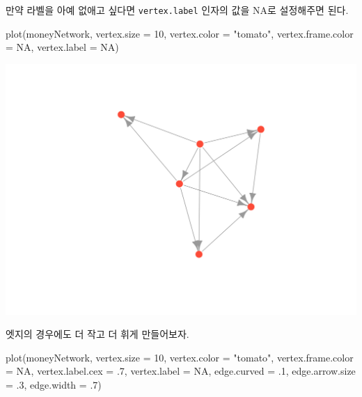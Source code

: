 \documentclass[
]{book}
\newenvironment{Shaded}{\begin{snugshade}}{\end{snugshade}}
\newcommand{\AttributeTok}[1]{\textcolor[rgb]{0.77,0.63,0.00}{#1}}
\newcommand{\ConstantTok}[1]{\textcolor[rgb]{0.00,0.00,0.00}{#1}}
\newcommand{\DecValTok}[1]{\textcolor[rgb]{0.00,0.00,0.81}{#1}}
\newcommand{\FunctionTok}[1]{\textcolor[rgb]{0.00,0.00,0.00}{#1}}
\newcommand{\NormalTok}[1]{#1}
\newcommand{\StringTok}[1]{\textcolor[rgb]{0.31,0.60,0.02}{#1}}
\begin{document}
만약 라벨을 아예 없애고 싶다면 \texttt{vertex.label} 인자의 값을 NA로 설정해주면 된다.

\begin{Shaded}
\begin{Highlighting}[]
\FunctionTok{plot}\NormalTok{(moneyNetwork, }\AttributeTok{vertex.size =} \DecValTok{10}\NormalTok{, }\AttributeTok{vertex.color =} \StringTok{"tomato"}\NormalTok{, }\AttributeTok{vertex.frame.color =} \ConstantTok{NA}\NormalTok{, }\AttributeTok{vertex.label =} \ConstantTok{NA}\NormalTok{)}
\end{Highlighting}
\end{Shaded}

\begin{center}\includegraphics[width=0.8\linewidth]{images/6} \end{center}

엣지의 경우에도 더 작고 더 휘게 만들어보자.

\begin{Shaded}
\begin{Highlighting}[]
\FunctionTok{plot}\NormalTok{(moneyNetwork, }\AttributeTok{vertex.size =} \DecValTok{10}\NormalTok{, }\AttributeTok{vertex.color =} \StringTok{"tomato"}\NormalTok{, }\AttributeTok{vertex.frame.color =} \ConstantTok{NA}\NormalTok{, }\AttributeTok{vertex.label.cex =}\NormalTok{ .}\DecValTok{7}\NormalTok{,  }\AttributeTok{vertex.label =} \ConstantTok{NA}\NormalTok{, }\AttributeTok{edge.curved =}\NormalTok{ .}\DecValTok{1}\NormalTok{, }\AttributeTok{edge.arrow.size =}\NormalTok{ .}\DecValTok{3}\NormalTok{, }\AttributeTok{edge.width =}\NormalTok{ .}\DecValTok{7}\NormalTok{)}
\end{Highlighting}
\end{Shaded}
\end{document}
